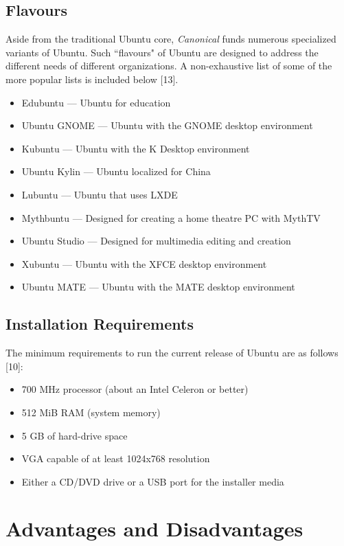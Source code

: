 \documentclass[11pt]{article}
\newcommand{\forceindent}{\leavevmode{\parindent=1em\indent}}
\begin{document}
\subsection{Flavours}
\forceindent Aside from the traditional Ubuntu core, \emph{Canonical} funds numerous specialized variants of Ubuntu. Such ``flavours" of Ubuntu are designed to address the different needs of different organizations. A non-exhaustive list of some of the more popular lists is included below [13].
\begin{itemize}
\item Edubuntu --- Ubuntu for education
\item Ubuntu GNOME --- Ubuntu with the GNOME desktop environment
\item Kubuntu --- Ubuntu with the K Desktop environment
\item Ubuntu Kylin --- Ubuntu localized for China
\item Lubuntu --- Ubuntu that uses LXDE
\item Mythbuntu --- Designed for creating a home theatre PC with MythTV
\item Ubuntu Studio --- Designed for multimedia editing and creation
\item Xubuntu --- Ubuntu with the XFCE desktop environment
\item Ubuntu MATE --- Ubuntu with the MATE desktop environment
\end{itemize}
\subsection{Installation Requirements}
The minimum requirements to run the current release of Ubuntu are as follows [10]:
\begin{itemize}
\item 700 MHz processor (about an Intel Celeron or better) 
\item 512 MiB RAM (system memory) 
\item 5 GB of hard-drive space
\item VGA capable of at least 1024x768 resolution 
\item Either a CD/DVD drive or a USB port for the installer media
\end{itemize}
\section{Advantages and Disadvantages}
\end{document}

